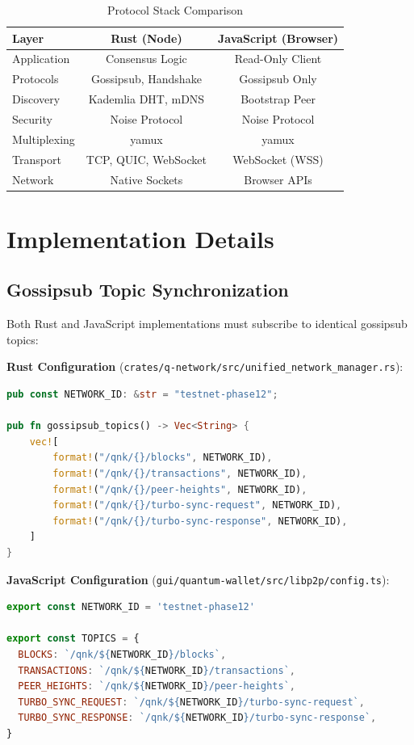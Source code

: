 \documentclass[11pt,a4paper]{article}
\begin{document}
\begin{table}[h]
\centering
\begin{tabular}{|l|c|c|}
\hline
\textbf{Layer} & \textbf{Rust (Node)} & \textbf{JavaScript (Browser)} \\
\hline
Application & Consensus Logic & Read-Only Client \\
\hline
Protocols & Gossipsub, Handshake & Gossipsub Only \\
\hline
Discovery & Kademlia DHT, mDNS & Bootstrap Peer \\
\hline
Security & Noise Protocol & Noise Protocol \\
\hline
Multiplexing & yamux & yamux \\
\hline
Transport & TCP, QUIC, WebSocket & WebSocket (WSS) \\
\hline
Network & Native Sockets & Browser APIs \\
\hline
\end{tabular}
\caption{Protocol Stack Comparison}
\end{table}

\section{Implementation Details}

\subsection{Gossipsub Topic Synchronization}

Both Rust and JavaScript implementations must subscribe to identical gossipsub topics:

\textbf{Rust Configuration} (\texttt{crates/q-network/src/unified\_network\_manager.rs}):

\begin{lstlisting}[language=Rust]
pub const NETWORK_ID: &str = "testnet-phase12";

pub fn gossipsub_topics() -> Vec<String> {
    vec![
        format!("/qnk/{}/blocks", NETWORK_ID),
        format!("/qnk/{}/transactions", NETWORK_ID),
        format!("/qnk/{}/peer-heights", NETWORK_ID),
        format!("/qnk/{}/turbo-sync-request", NETWORK_ID),
        format!("/qnk/{}/turbo-sync-response", NETWORK_ID),
    ]
}
\end{lstlisting}

\textbf{JavaScript Configuration} (\texttt{gui/quantum-wallet/src/libp2p/config.ts}):

\begin{lstlisting}[language=JavaScript]
export const NETWORK_ID = 'testnet-phase12'

export const TOPICS = {
  BLOCKS: `/qnk/${NETWORK_ID}/blocks`,
  TRANSACTIONS: `/qnk/${NETWORK_ID}/transactions`,
  PEER_HEIGHTS: `/qnk/${NETWORK_ID}/peer-heights`,
  TURBO_SYNC_REQUEST: `/qnk/${NETWORK_ID}/turbo-sync-request`,
  TURBO_SYNC_RESPONSE: `/qnk/${NETWORK_ID}/turbo-sync-response`,
}
\end{lstlisting}
\end{document}
